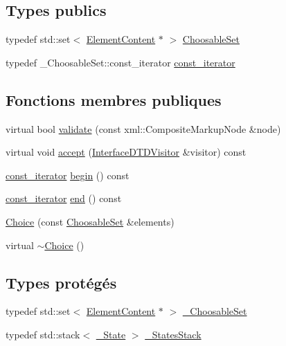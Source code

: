 \subsection*{Types publics}
\begin{DoxyCompactItemize}
\item 
typedef std::set$<$ \hyperlink{classdtd_1_1_element_content}{ElementContent} $\ast$ $>$ \hyperlink{classdtd_1_1_choice_af9629ca325eb99da3f274b2ad3dc2060}{ChoosableSet}
\item 
typedef \_\-ChoosableSet::const\_\-iterator \hyperlink{classdtd_1_1_choice_a127d277a680fe88ae37034deeefbfca4}{const\_\-iterator}
\end{DoxyCompactItemize}
\subsection*{Fonctions membres publiques}
\begin{DoxyCompactItemize}
\item 
virtual bool \hyperlink{classdtd_1_1_choice_ad0302d4e2b758025b430014fe8c20046}{validate} (const xml::CompositeMarkupNode \&node)
\item 
virtual void \hyperlink{classdtd_1_1_choice_a2eaed96716e6d7583c4b64f514c71b9d}{accept} (\hyperlink{classdtd_1_1_interface_d_t_d_visitor}{InterfaceDTDVisitor} \&visitor) const 
\item 
\hyperlink{classdtd_1_1_choice_a127d277a680fe88ae37034deeefbfca4}{const\_\-iterator} \hyperlink{classdtd_1_1_choice_afc189b482d6c53c47620ee23403205e0}{begin} () const 
\item 
\hyperlink{classdtd_1_1_choice_a127d277a680fe88ae37034deeefbfca4}{const\_\-iterator} \hyperlink{classdtd_1_1_choice_a65cea1b2b4c2ebb97650a0cc0153488e}{end} () const 
\item 
\hyperlink{classdtd_1_1_choice_a2d10476c9ccca603a8978d68de7957ca}{Choice} (const \hyperlink{classdtd_1_1_choice_af9629ca325eb99da3f274b2ad3dc2060}{ChoosableSet} \&elements)
\item 
virtual \hyperlink{classdtd_1_1_choice_ace8ec16e92018c56abda356776293f60}{$\sim$Choice} ()
\end{DoxyCompactItemize}
\subsection*{Types protégés}
\begin{DoxyCompactItemize}
\item 
typedef std::set$<$ \hyperlink{classdtd_1_1_element_content}{ElementContent} $\ast$ $>$ \hyperlink{classdtd_1_1_choice_a07352a0a4e78923e41370e6b00af1c86}{\_\-ChoosableSet}
\item 
typedef std::stack$<$ \hyperlink{structdtd_1_1_choice_1_1___state}{\_\-State} $>$ \hyperlink{classdtd_1_1_choice_a804cc83d915d4a96b04a850cf99b7b51}{\_\-StatesStack}
\end{DoxyCompactItemize}
